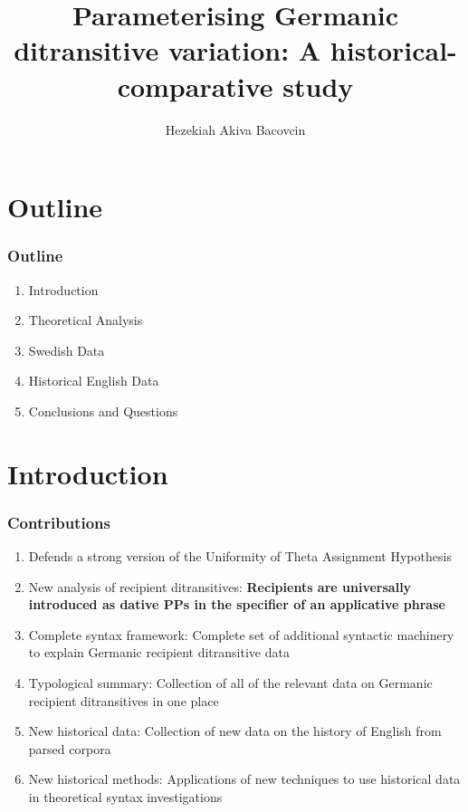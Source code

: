 \documentclass{beamer}
\title[]{\textbf{Parameterising Germanic ditransitive variation: A historical-comparative study}}
\author{Hezekiah Akiva Bacovcin}
\institute{University of Pennsylvania - Department of Linguistics}
\begin{document}
\begin{frame}
\titlepage
\end{frame}

\section{Outline}
\begin{frame}
\frametitle{Outline}
\begin{enumerate}
\item Introduction
\item Theoretical Analysis
\item Swedish Data
\item Historical English Data
\item Conclusions and Questions
\end{enumerate}
\end{frame}

\section{Introduction}
\begin{frame}
		\frametitle{Contributions}
		\begin{enumerate}
			\item Defends a strong version of the Uniformity of Theta Assignment Hypothesis
			\item New analysis of recipient ditransitives: \textbf{Recipients are universally introduced as dative PPs in the specifier of an applicative phrase}
			\item Complete syntax framework: Complete set of additional syntactic machinery to explain Germanic recipient ditransitive data
			\item Typological summary: Collection of all of the relevant data on Germanic recipient ditransitives in one place
			\item New historical data: Collection of new data on the history of English from parsed corpora
			\item New historical methods: Applications of new techniques to use historical data in theoretical syntax investigations
		\end{enumerate}
\end{frame}
\end{document}
